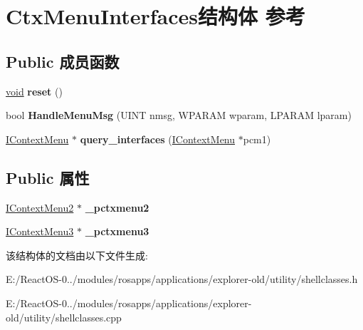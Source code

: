 \hypertarget{struct_ctx_menu_interfaces}{}\section{Ctx\+Menu\+Interfaces结构体 参考}
\label{struct_ctx_menu_interfaces}
\subsection*{Public 成员函数}
\begin{DoxyCompactItemize}
\item 
\mbox{\label{struct_ctx_menu_interfaces_ad9f2b16810f19df39ef23b23f20a00f3}} 
\hyperlink{interfacevoid}{void} {\bfseries reset} ()
\item 
\mbox{\label{struct_ctx_menu_interfaces_a20fe9c05296a18f18894471e05df7ddb}} 
bool {\bfseries Handle\+Menu\+Msg} (U\+I\+NT nmsg, W\+P\+A\+R\+AM wparam, L\+P\+A\+R\+AM lparam)
\item 
\mbox{\label{struct_ctx_menu_interfaces_a3aacd29c82411e37daf6cf8467e32db1}} 
\hyperlink{interface_i_context_menu}{I\+Context\+Menu} $\ast$ {\bfseries query\+\_\+interfaces} (\hyperlink{interface_i_context_menu}{I\+Context\+Menu} $\ast$pcm1)
\end{DoxyCompactItemize}
\subsection*{Public 属性}
\begin{DoxyCompactItemize}
\item 
\mbox{\label{struct_ctx_menu_interfaces_a4928e78520137644dda836ae4afa51bc}} 
\hyperlink{interface_i_context_menu2}{I\+Context\+Menu2} $\ast$ {\bfseries \+\_\+pctxmenu2}
\item 
\mbox{\label{struct_ctx_menu_interfaces_abfde615301ab42ad50e5c39635e52df9}} 
\hyperlink{interface_i_context_menu3}{I\+Context\+Menu3} $\ast$ {\bfseries \+\_\+pctxmenu3}
\end{DoxyCompactItemize}


该结构体的文档由以下文件生成\+:\begin{DoxyCompactItemize}
\item 
E\+:/\+React\+O\+S-\/0../modules/rosapps/applications/explorer-\/old/utility/shellclasses.\+h\item 
E\+:/\+React\+O\+S-\/0../modules/rosapps/applications/explorer-\/old/utility/shellclasses.\+cpp\end{DoxyCompactItemize}
